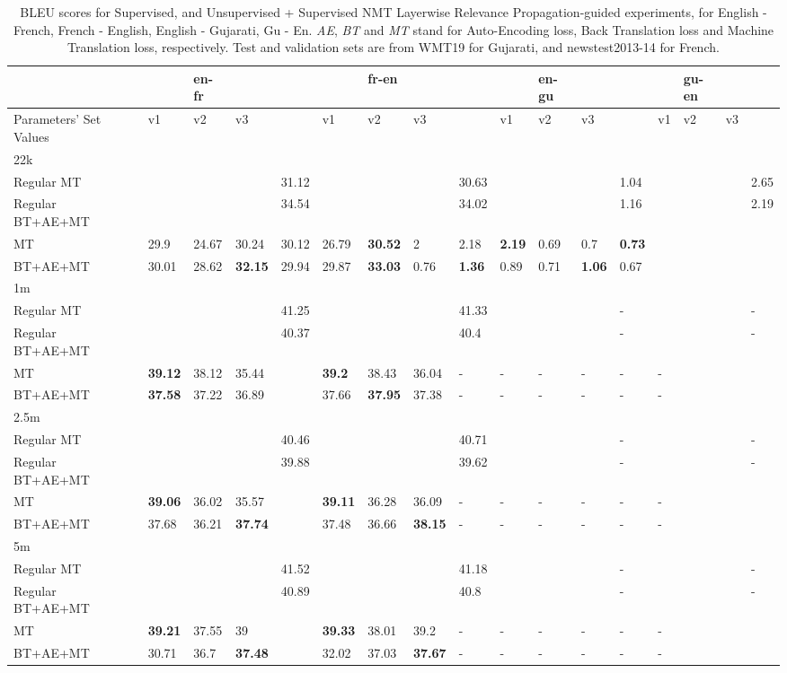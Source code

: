 \clearpage
\setlength\rotFPtop{242pt}
\begin{sidewaystable}[htbp]
\small
\begin{tabular}{l  B lll|l|lll|l|lll|l|lll|l}
\toprule
&&& \textbf{en-fr} & &&  & \textbf{fr-en} & && & \textbf{en-gu} &&&& \textbf{gu-en} && \\\hline
Parameters' Set Values &  & v1 & v2 & v3 && v1 & v2 & v3 && v1 & v2    & v3 && v1 & v2    & v3 \\\hline\hline
22k  &  && &&&   &&&   &&&   & \\\hline
Regular MT &&&&&31.12 &&&&30.63   &&&&1.04   &&&&2.65 \\
Regular BT+AE+MT &  &&&&34.54 &&&&34.02  &&&&1.16   &&&&2.19 \\\hline
MT  &&29.9&24.67&30.24&30.12&26.79 &\textbf{30.52}&2&2.18&\textbf{2.19}&0.69&0.7 &\textbf{0.73} \\
BT+AE+MT &&30.01&28.62&\textbf{32.15}&29.94&29.87&\textbf{33.03}&0.76&\textbf{1.36}&0.89&0.71&\textbf{1.06}&0.67\\\hline\hline
1m  & &&&&&&&&&&&&\\\hline
Regular MT &&&&&41.25 &&&&41.33   &&&&-   &&&&- \\
Regular BT+AE+MT &  &&&&40.37 &&&&40.4  &&&&-   &&&&- \\\hline
MT & &\textbf{39.12}& 38.12&35.44 && \textbf{39.2}&38.43&36.04&-&-&-&-&-&-\\
BT+AE+MT & & \textbf{37.58}& 37.22& 36.89&& 37.66& \textbf{37.95}& 37.38&-&-&-&-&-&-\\\hline\hline
2.5m  &&&&&&&&&&&&   &\\\hline
Regular MT &&&&&40.46 &&&&40.71   &&&&-   &&&&- \\
Regular BT+AE+MT &  &&&&39.88 &&&&39.62  &&&&-   &&&&- \\\hline
MT &  &\textbf{39.06}&36.02  &35.57&&\textbf{39.11} &36.28&36.09&-&-&-&-&-&-\\
BT+AE+MT &  &37.68 & 36.21& \textbf{37.74}  &&37.48 &36.66& \textbf{38.15}&-&-&-&-&-&-\\\hline\hline
5m &&&&&&&&&&&&&\\\hline
Regular MT &&&&&41.52 &&&&41.18   &&&&-   &&&&- \\
Regular BT+AE+MT &  &&&&40.89 &&&&40.8  &&&&-   &&&&- \\\hline
MT  &&\textbf{39.21} &37.55&39&&\textbf{39.33} &38.01&39.2&-&-&-&-&-&-\\
BT+AE+MT &&30.71&36.7&\textbf{37.48}&&32.02 &37.03&\textbf{37.67}&-&-&-&-&-&-
\end{tabular}
\hline
\caption{BLEU scores for Supervised, and Unsupervised + Supervised NMT Layerwise Relevance Propagation-guided experiments, for English - French, French - English, English - Gujarati, Gu - En. \emph{AE}, \emph{BT} and \emph{MT} stand for Auto-Encoding loss, Back Translation loss and Machine Translation loss, respectively. Test and validation sets are from WMT19 for Gujarati, and newstest2013-14 for French.}
\vspace{-2mm}
\label{table:bleu_results_lrp_train}
\vspace{-0.5em}
\end{sidewaystable}